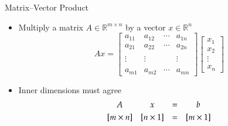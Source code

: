 \documentclass[10pt]{beamer}
\begin{document}
\begin{frame}{Matrix--Vector Product}
\begin{itemize}
\item Multiply a matrix $A\in\mathbb{R}^{m\times n}$
by a vector $x\in\mathbb{R}^n$
    \begin{equation*}
        Ax = \begin{bmatrix} a_{11} & a_{12} & \cdots & a_{1n} \\
                        a_{21} & a_{22} & \cdots & a_{2n} \\
                               &        &        &        \\
                        \vdots & \vdots &        & \vdots \\
                               &        &        &        \\
                        a_{m1} & a_{m2} & \cdots & a_{mn}
        \end{bmatrix}
        \begin{bmatrix} x_1 \\ x_2 \\ \vdots \\ x_n \end{bmatrix}
    \end{equation*}
    \item Inner dimensions must agree
    $$
    \begin{array}{cccc}
                A       &        x        & = & b \\[3pt]
        [m\times n] & [n\times1] & = & [m\times1]
    \end{array}$$
\end{itemize}
\end{frame}
\end{document}
